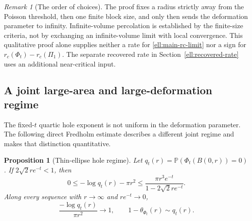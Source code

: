 \documentclass[11pt,a4paper]{article}
\newtheorem{proposition}[theorem]{Proposition}
\theoremstyle{definition}
\theoremstyle{remark}
\newtheorem{remark}[theorem]{Remark}
\numberwithin{equation}{section}
\begin{document}
\begin{remark}[The order of choices]\label{ell:limit-scope}
The proof fixes a radius strictly away from the Poisson threshold,
then one finite block size, and only then sends the deformation
parameter to infinity.  Infinite-volume percolation is established
by the finite-size criteria, not by exchanging an infinite-volume
limit with local convergence. This qualitative proof alone supplies neither a rate
for \eqref{ell:main-rc-limit} nor a sign for
$r_c(\Phi_t)-r_c(\Pi_1)$. The separate recovered rate in
Section~\ref{ell:recovered-rate} uses an additional near-critical input.
\end{remark}

\subsection{A joint large-area and large-deformation regime}

The fixed-$t$ quartic hole exponent is not uniform in the
deformation parameter.  The following direct Fredholm estimate
describes a different joint regime and makes that distinction
quantitative.

\begin{proposition}[Thin-ellipse hole regime]\label{ell:joint-hole}
Let $q_t(r)=\mathbb P(\Phi_t(B(0,r))=0)$.  If
$2\sqrt2 r e^{-t}<1$, then
\begin{equation}\label{ell:joint-hole-bound}
 0\le-\log q_t(r)-\pi r^2
 \le\frac{\pi r^3e^{-t}}{1-2\sqrt2 r e^{-t}}.
\end{equation}
Along every sequence with $r\to\infty$ and $r e^{-t}\to0$,
\begin{equation}\label{ell:joint-hole-limit}
 \frac{-\log q_t(r)}{\pi r^2}\longrightarrow1,
 \qquad
 1-\theta_{\Phi_t}(r)\sim q_t(r).
\end{equation}
\end{proposition}
\end{document}

